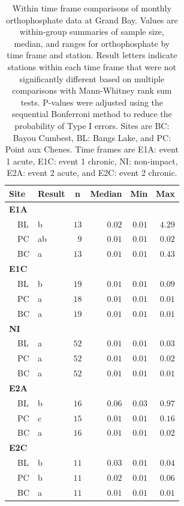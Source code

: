 \documentclass[letterpaper,12pt]{article}\usepackage[]{graphicx}\usepackage[]{color}
\newcommand{\beginsupplement}{%
        \setcounter{table}{0}
        \renewcommand{\thetable}{S\arabic{table}}%
        \setcounter{figure}{0}
        \renewcommand{\thefigure}{S\arabic{figure}}%
     }
\begin{document}
\begin{table}[!tbp]
\caption{Within time frame comparisons of monthly orthophosphate data at Grand Bay.  Values are within-group summaries of sample size, median, and ranges for orthophosphate by time frame and station.  Result letters indicate stations within each time frame that were not significantly different based on multiple comparisons with Mann-Whitney rank sum tests.  P-values were adjusted using the sequential Bonferroni method to reduce the probability of Type I errors. Sites are BC: Bayou Cumbest, BL: Bangs Lake, and PC: Point aux Chenes.  Time frames are E1A: event 1 acute, E1C: event 1 chronic, NI: non-impact, E2A: event 2 acute, and E2C: event 2 chronic.\label{tab:orthtab2}} 
\begin{center}
\begin{tabular}{llrrrr}
\hline\hline
\multicolumn{1}{l}{Site}&\multicolumn{1}{c}{Result}&\multicolumn{1}{c}{n}&\multicolumn{1}{c}{Median}&\multicolumn{1}{c}{Min}&\multicolumn{1}{c}{Max}\tabularnewline
\hline
{\bfseries E1A}&&&&&\tabularnewline
~~BL&b&$13$&$0.02$&$0.01$&$4.29$\tabularnewline
~~PC&ab&$ 9$&$0.01$&$0.01$&$0.02$\tabularnewline
~~BC&a&$13$&$0.01$&$0.01$&$0.43$\tabularnewline
\hline
{\bfseries E1C}&&&&&\tabularnewline
~~BL&b&$19$&$0.01$&$0.01$&$0.09$\tabularnewline
~~PC&a&$18$&$0.01$&$0.01$&$0.01$\tabularnewline
~~BC&a&$19$&$0.01$&$0.01$&$0.01$\tabularnewline
\hline
{\bfseries NI}&&&&&\tabularnewline
~~BL&a&$52$&$0.01$&$0.01$&$0.03$\tabularnewline
~~PC&a&$52$&$0.01$&$0.01$&$0.02$\tabularnewline
~~BC&a&$52$&$0.01$&$0.01$&$0.01$\tabularnewline
\hline
{\bfseries E2A}&&&&&\tabularnewline
~~BL&b&$16$&$0.06$&$0.03$&$0.97$\tabularnewline
~~PC&c&$15$&$0.01$&$0.01$&$0.16$\tabularnewline
~~BC&a&$16$&$0.01$&$0.01$&$0.02$\tabularnewline
\hline
{\bfseries E2C}&&&&&\tabularnewline
~~BL&b&$11$&$0.03$&$0.01$&$0.04$\tabularnewline
~~PC&b&$11$&$0.02$&$0.01$&$0.06$\tabularnewline
~~BC&a&$11$&$0.01$&$0.01$&$0.01$\tabularnewline
\hline
\end{tabular}\end{center}

\end{table}

\clearpage

\beginsupplement
\end{document}
